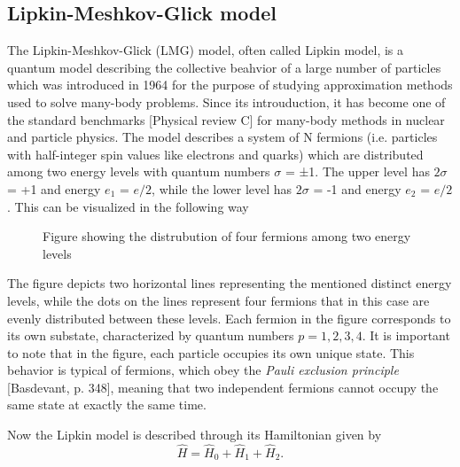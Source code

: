 \documentclass[onecolumn,10pt,cleanfoot]{asme2ej}
\begin{document}
\subsection{Lipkin-Meshkov-Glick model}
The Lipkin-Meshkov-Glick (LMG) model, often called Lipkin model, is a quantum model describing the collective beahvior of a large number of particles which was introduced in 1964 for the purpose of studying approximation methods used to solve many-body problems. Since its introuduction, it has become one of the standard benchmarks [Physical review C] for many-body methods in nuclear and particle physics. The model describes a system of N fermions (i.e. particles with half-integer spin values like electrons and quarks) which are distributed among two energy levels with quantum numbers $\sigma$ = ±1. The upper level has $2\sigma$ = +1 and energy $e_{1}$ = $e/2$, while the lower level has $2\sigma$ = -1 and energy $e_{2}$ = $e/2$. This can be visualized in the following way

\begin{figure}[H]
	\centering
	\caption{Figure showing the distrubution of four fermions among two energy levels}
\end{figure}

The figure depicts two horizontal lines representing the mentioned distinct energy levels, while the dots on the lines represent four fermions that in this case are evenly distributed between these levels. Each fermion in the figure corresponds to its own substate, characterized by quantum numbers $p = 1, 2, 3, 4$. It is important to note that in the figure, each particle occupies its own unique state. This behavior is typical of fermions, which obey the \textit{Pauli exclusion principle} [Basdevant, p. 348], meaning that two independent fermions cannot occupy the same state at exactly the same time.

Now the Lipkin model is described through its Hamiltonian given by 
\begin{equation}
\hat{H} = \hat{H}_{0} + \hat{H}_{1} + \hat{H}_{2}.
\end{equation}
\end{document}
